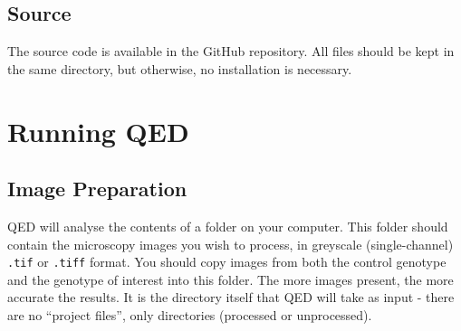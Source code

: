 \documentclass[a4paper,11pt]{article}
\begin{document}

\subsection{Source}

The source code is available in the GitHub repository. All files should be kept in the same directory, but otherwise, no installation is necessary.










\newpage
\section{Running QED}

\subsection{Image Preparation}
QED will analyse the contents of a folder on your computer. This folder should contain the microscopy images you wish to process, in greyscale (single-channel) \texttt{.tif} or \texttt{.tiff} format. You should copy images from both the control genotype and the genotype of interest into this folder. The more images present, the more accurate the results. It is the directory itself that QED will take as input - there are no ``project files'', only directories (processed or unprocessed).
\end{document}
